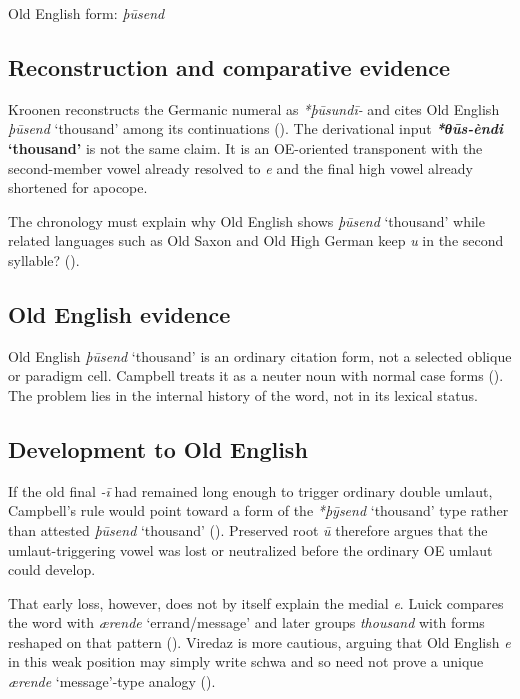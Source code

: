 \documentclass[
  british,
  a4paper,
  openany]{book}
\providecommand{\Recon}[1]{\emph{*#1}}
{\catcode`→=\active \global\def→{\ensuremath{\rightarrow}}}
\providecommand{\Recon}[1]{\emph{*#1}}
{\catcode`→=\active \global\def→{\ensuremath{\rightarrow}}}
\begin{document}
Old English form: \emph{þūsend}

\subsection{Reconstruction and comparative
evidence}\label{reconstruction-and-comparative-evidence-99}

Kroonen reconstructs the Germanic numeral as {\emph{*þūsundī-}} and
cites Old English {\emph{þūsend}} `thousand' among its continuations
(). The derivational input
\textbf{{\Recon{θūs-èndi} `thousand'}} is not the same claim. It is an
OE-oriented transponent with the second-member vowel already resolved to
\emph{e} and the final high vowel already shortened for apocope.

The chronology must explain why Old English shows {\emph{þūsend}}
`thousand' while related languages such as Old Saxon and Old High German
keep \emph{u} in the second syllable?
().

\subsection{Old English evidence}\label{old-english-evidence-99}

Old English \emph{þūsend} `thousand' is an ordinary citation form, not a
selected oblique or paradigm cell. Campbell treats it as a neuter noun
with normal case forms (). The problem lies in the internal history of the word, not in its
lexical status.

\subsection{Development to Old
English}\label{development-to-old-english-99}

If the old final \emph{-ī} had remained long enough to trigger ordinary
double umlaut, Campbell's rule would point toward a form of the
{\emph{*þȳsend}} `thousand' type rather than attested {\emph{þūsend}}
`thousand' ().
Preserved root \emph{ū} therefore argues that the umlaut-triggering
vowel was lost or neutralized before the ordinary OE umlaut could
develop.

That early loss, however, does not by itself explain the medial
\emph{e}. Luick compares the word with {\emph{ærende}} `errand/message'
and later groups \emph{thousand} with forms reshaped on that pattern
(). Viredaz
is more cautious, arguing that Old English \emph{e} in this weak
position may simply write schwa and so need not prove a unique
\emph{ærende} `message'-type analogy
().
\end{document}
